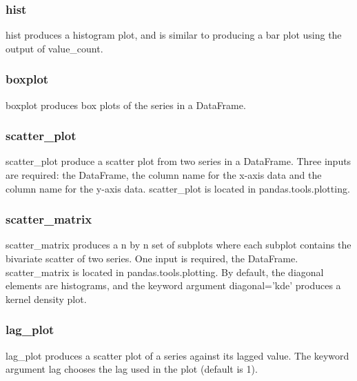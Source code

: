 \documentclass[KSmain.tex]{subfiles}
\begin{document}
\subsubsection{hist}
hist produces a histogram plot, and is similar to producing a bar plot using the output of value\_count.

\subsubsection{boxplot}
boxplot produces box plots of the series in a DataFrame.
\subsubsection{scatter\_plot}
scatter\_plot produce a scatter plot from two series in a DataFrame. Three inputs are required: the
DataFrame, the column name for the x-axis data and the column name for the y-axis data. scatter\_plot
is located in pandas.tools.plotting.
\subsubsection{scatter\_matrix}
scatter\_matrix produces a n by n set of subplots where each subplot contains the bivariate scatter of
two series. One input is required, the DataFrame. scatter\_matrix is located in pandas.tools.plotting.
By default, the diagonal elements are histograms, and the keyword argument diagonal=’kde’ produces a
kernel density plot.
\subsubsection{lag\_plot}
lag\_plot produces a scatter plot of a series against its lagged value. The keyword argument lag chooses
the lag used in the plot (default is 1).
\end{document}
